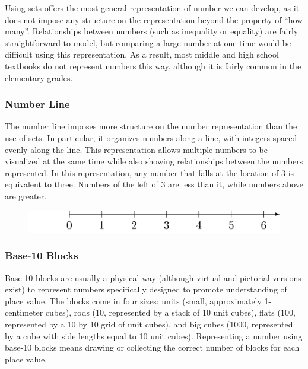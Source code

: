 \documentclass[
]{book}
\theoremstyle{definition}
\theoremstyle{definition}
\theoremstyle{definition}
\theoremstyle{definition}
\theoremstyle{remark}
\begin{document}
Using sets offers the most general representation of number we can develop, as it does not impose any structure on the representation beyond the property of ``how many''. Relationships between numbers (such as inequality or equality) are fairly straightforward to model, but comparing a large number at one time would be difficult using this representation. As a result, most middle and high school textbooks do not represent numbers this way, although it is fairly common in the elementary grades.

\hypertarget{number-line}{%
\subsubsection*{Number Line}\label{number-line}}

The number line imposes more structure on the number representation than the use of sets. In particular, it organizes numbers along a line, with integers spaced evenly along the line. This representation allows multiple numbers to be visualized at the same time while also showing relationships between the numbers represented. In this representation, any number that falls at the location of 3 is equivalent to three. Numbers of the left of 3 are less than it, while numbers above are greater.

\begin{figure}

{\centering \includegraphics[width=0.8\linewidth]{tikz/number-line-representation} 

}

\end{figure}

\hypertarget{base-10-blocks}{%
\subsubsection*{Base-10 Blocks}\label{base-10-blocks}}

Base-10 blocks are usually a physical way (although virtual and pictorial versions exist) to represent numbers specifically designed to promote understanding of place value. The blocks come in four sizes: units (small, approximately 1-centimeter cubes), rods (10, represented by a stack of 10 unit cubes), flats (100, represented by a 10 by 10 grid of unit cubes), and big cubes (1000, represented by a cube with side lengths equal to 10 unit cubes). Representing a number using base-10 blocks means drawing or collecting the correct number of blocks for each place value.
\end{document}
